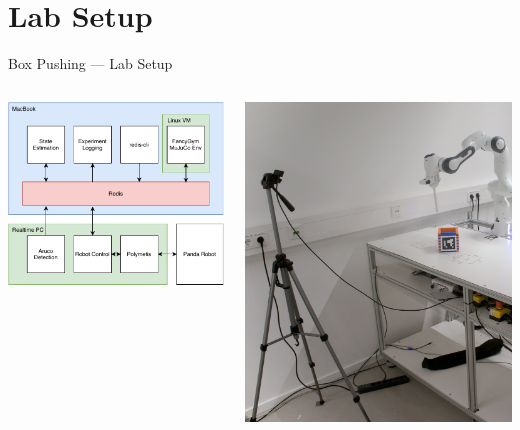\documentclass[16:9,en,navbarinfooter]{sdqbeamer}
\begin{document}
\section{Lab Setup}
\begin{frame}{Box Pushing --- Lab Setup}
    \begin{columns}
    \begin{column}{0.45\textwidth}
    \vspace{1cm}
\includegraphics[width=\linewidth]{media/Architecture.pdf}

    \end{column}
    \begin{column}{0.35\textwidth}
    \vspace{1cm}
\includegraphics[width=\linewidth]{media/labsetup2.jpg}


\end{column}
\end{columns}
\end{frame}
\end{document}
